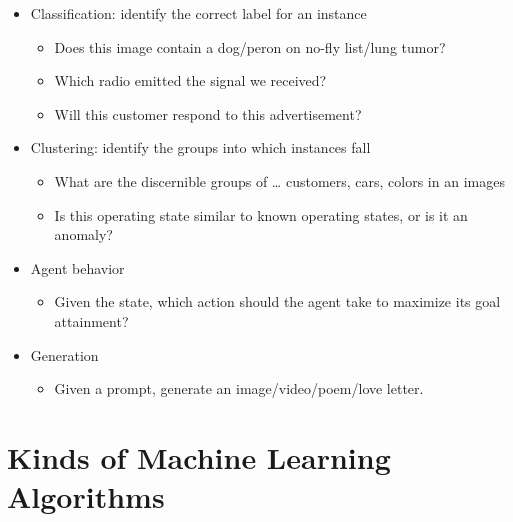 \documentclass[11pt]{article}
\begin{document}
\begin{itemize}
\item Classification: identify the correct label for an instance
\begin{itemize}
\item Does this image contain a dog/peron on no-fly list/lung tumor?
\item Which radio emitted the signal we received?
\item Will this customer respond to this advertisement?
\end{itemize}

\item Clustering: identify the groups into which instances fall
\begin{itemize}
\item What are the discernible groups of \ldots{} customers, cars, colors in an images
\item Is this operating state similar to known operating states, or is it an anomaly?
\end{itemize}

\item Agent behavior
\begin{itemize}
\item Given the state, which action should the agent take to maximize its goal attainment?
\end{itemize}

\item Generation
\begin{itemize}
\item Given a prompt, generate an image/video/poem/love letter.
\end{itemize}
\end{itemize}
\section{Kinds of Machine Learning Algorithms}
\label{sec:orgeea52d4}
\end{document}
